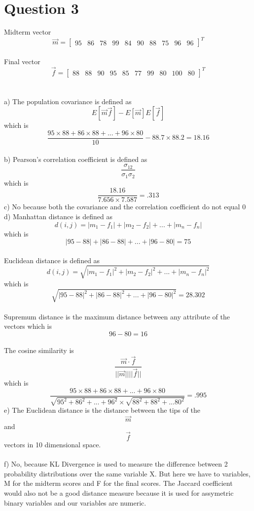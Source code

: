 \documentclass{article}
\begin{document}
\section{Question 3}
Midterm vector $$\vec{m} = \begin{bmatrix} 95 & 86 & 78 & 99 & 84 & 90 & 88 & 75 & 96 & 96 \end{bmatrix}^T$$\\
Final vector $$\vec{f} = \begin{bmatrix} 88 & 88 & 90 & 95 & 85 & 77 & 99 & 80 & 100 & 80 \end{bmatrix}^T$$\\\\
a) The population covariance is defined as $$E[\vec{m}\vec{f}]-E[\vec{m}]E[\vec{f}]$$ which is $$\frac{95\times88+86\times88+...+96\times80}{10}-88.7\times88.2=18.16$$\\
b) Pearson's correlation coefficient is defined as $$\frac{\sigma_{12}}{\sigma_1\sigma_2}$$ which is $$\frac{18.16}{7.656\times7.587}=.313$$
c) No because both the covariance and the correlation coefficient do not equal 0\\
d) Manhattan distance is defined as $$d(i,j)=|m_1-f_1|+|m_2-f_2|+...+|m_n-f_n|$$ which is $$|95-88|+|86-88|+...+|96-80|=75$$\\
Euclidean distance is defined as $$d(i,j)=\sqrt{|m_1-f_1|^2+|m_2-f_2|^2+...+|m_n-f_n|^2}$$ which is $$\sqrt{|95-88|^2+|86-88|^2+...+|96-80|^2}=28.302$$\\
Supremum distance is the maximum distance between any attribute of the vectors which is $$96-80=16$$\\
The cosine similarity is $$\frac{\vec{m}\cdot\vec{f}}{||\vec{m}||||\vec{f}||}$$ which is $$\frac{95\times88+86\times88+...+96\times80}{\sqrt{95^2+86^2+...+96^2}\times\sqrt{88^2+88^2+...80^2}}=.995$$
e) The Euclidean distance is the distance between the tips of the $$\vec{m}$$ and $$\vec{f}$$ vectors in 10 dimensional space.\\\\
f) No, because KL Divergence is used to measure the difference between 2 probability distributions over the same variable X.  But here we have to variables, M for the midterm scores and F for the final scores.  The Jaccard coefficient would also not be a good distance measure because it is used for assymetric binary variables and our variables are numeric.
\end{document}

